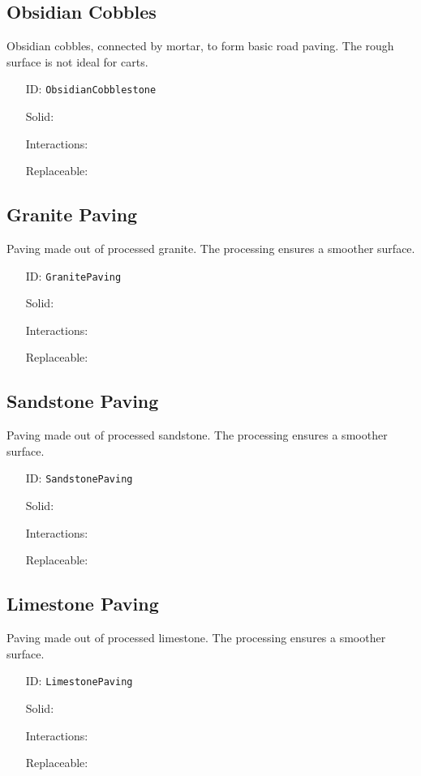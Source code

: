 \subsection{Obsidian Cobbles}\label{subsec:blocks_obsidian cobbles}
Obsidian cobbles, connected by mortar, to form basic road paving.
                The rough surface is not ideal for carts.
\newline
\begin{itemize}[nosep]
\item[ID:] \texttt{ObsidianCobblestone}
\item[Solid:]  \Checkmark \item[Interactions:]  \XSolidBrush \item[Replaceable:]  \XSolidBrush \end{itemize}

\subsection{Granite Paving}\label{subsec:blocks_granite paving}
Paving made out of processed granite.
                The processing ensures a smoother surface.
\newline
\begin{itemize}[nosep]
\item[ID:] \texttt{GranitePaving}
\item[Solid:]  \Checkmark \item[Interactions:]  \XSolidBrush \item[Replaceable:]  \XSolidBrush \end{itemize}

\subsection{Sandstone Paving}\label{subsec:blocks_sandstone paving}
Paving made out of processed sandstone.
                The processing ensures a smoother surface.
\newline
\begin{itemize}[nosep]
\item[ID:] \texttt{SandstonePaving}
\item[Solid:]  \Checkmark \item[Interactions:]  \XSolidBrush \item[Replaceable:]  \XSolidBrush \end{itemize}

\subsection{Limestone Paving}\label{subsec:blocks_limestone paving}
Paving made out of processed limestone.
                The processing ensures a smoother surface.
\newline
\begin{itemize}[nosep]
\item[ID:] \texttt{LimestonePaving}
\item[Solid:]  \Checkmark \item[Interactions:]  \XSolidBrush \item[Replaceable:]  \XSolidBrush \end{itemize}

